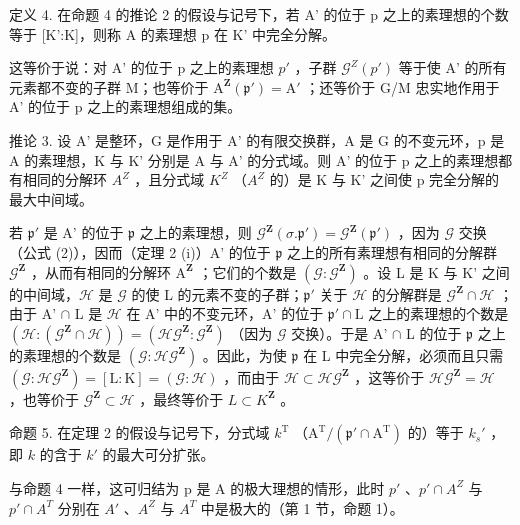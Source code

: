 定义 4. 在命题 4 的推论 2 的假设与记号下，若 A' 的位于 p 之上的素理想的个数等于 [K':K]，则称 A 的素理想 p 在 K' 中完全分解。

这等价于说：对 A' 的位于 p 之上的素理想 \(p'\) ，子群 \(\mathcal{G}^{Z}(p')\) 等于使 A' 的所有元素都不变的子群 M；也等价于 \(\mathrm{A}^{\mathbf{Z}}(\mathfrak{p}') = \mathrm{A}'\) ；还等价于 G/M 忠实地作用于 A' 的位于 p 之上的素理想组成的集。

推论 3. 设 A' 是整环，G 是作用于 A' 的有限交换群，A 是 G 的不变元环，p 是 A 的素理想，K 与 K' 分别是 A 与 A' 的分式域。则 A' 的位于 p 之上的素理想都有相同的分解环 \(A^{Z}\) ，且分式域 \(K^{Z}\) （\(A^{Z}\) 的）是 K 与 K' 之间使 p 完全分解的最大中间域。

若 \(\mathfrak{p}'\) 是 A' 的位于 \(\mathfrak{p}\) 之上的素理想，则 \(\mathcal{G}^{\mathbf{Z}}(\sigma. \mathfrak{p}') = \mathcal{G}^{\mathbf{Z}}(\mathfrak{p}')\) ，因为 \(\mathcal{G}\) 交换（公式 (2)），因而（定理 2 (i)）A' 的位于 \(\mathfrak{p}\) 之上的所有素理想有相同的分解群 \(\mathcal{G}^{\mathbf{Z}}\) ，从而有相同的分解环 \(\mathrm{A}^{\mathbf{Z}}\) ；它们的个数是 \((\mathcal{G}: \mathcal{G}^{\mathbf{Z}})\) 。设 L 是 K 与 K' 之间的中间域，\(\mathcal{H}\) 是 \(\mathcal{G}\) 的使 L 的元素不变的子群；\(\mathfrak{p}'\) 关于 \(\mathcal{H}\) 的分解群是 \(\mathcal{G}^{\mathbf{Z}} \cap \mathcal{H}\) ；由于 A' \(\cap\) L 是 \(\mathcal{H}\) 在 A' 中的不变元环，A' 的位于 \(\mathfrak{p}' \cap \mathrm{L}\) 之上的素理想的个数是 \((\mathcal{H}: (\mathcal{G}^{\mathbf{Z}} \cap \mathcal{H})) = (\mathcal{H}\mathcal{G}^{\mathbf{Z}}: \mathcal{G}^{\mathbf{Z}})\) （因为 \(\mathcal{G}\) 交换）。于是 A' \(\cap\) L 的位于 \(\mathfrak{p}\) 之上的素理想的个数是 \((\mathcal{G}: \mathcal{H}\mathcal{G}^{\mathbf{Z}})\) 。因此，为使 \(\mathfrak{p}\) 在 L 中完全分解，必须而且只需 \((\mathcal{G}: \mathcal{H}\mathcal{G}^{\mathbf{Z}}) = [\mathrm{L}: \mathrm{K}] = (\mathcal{G}: \mathcal{H})\) ，而由于 \(\mathcal{H} \subset \mathcal{H}\mathcal{G}^{\mathbf{Z}}\) ，这等价于 \(\mathcal{H}\mathcal{G}^{\mathbf{Z}} = \mathcal{H}\) ，也等价于 \(\mathcal{G}^{\mathbf{Z}} \subset \mathcal{H}\) ，最终等价于 \(L \subset K^{\mathbf{Z}}\) 。

命题 5. 在定理 2 的假设与记号下，分式域 \(k^{\mathrm{T}}\) （\(\mathrm{A}^{\mathrm{T}} / (\mathfrak{p}' \cap \mathrm{A}^{\mathrm{T}})\) 的）等于 \(k_s'\) ，即 \(k\) 的含于 \(k'\) 的最大可分扩张。

与命题 4 一样，这可归结为 p 是 A 的极大理想的情形，此时 \(p'\) 、\(p' \cap A^{Z}\) 与 \(p' \cap A^{T}\) 分别在 \(A'\) 、\(A^{Z}\) 与 \(A^{T}\) 中是极大的（第 1 节，命题 1）。

